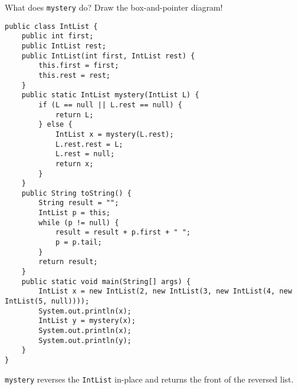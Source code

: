 \begin{blocksection}
\question What does \lstinline$mystery$ do? Draw the box-and-pointer diagram!

\begin{lstlisting}
public class IntList {
    public int first;
    public IntList rest;
    public IntList(int first, IntList rest) {
        this.first = first;
        this.rest = rest;
    }
    public static IntList mystery(IntList L) {
        if (L == null || L.rest == null) {
            return L;
        } else {
            IntList x = mystery(L.rest);
            L.rest.rest = L;
            L.rest = null;
            return x;
        }
    }
    public String toString() {
        String result = "";
        IntList p = this;
        while (p != null) {
            result = result + p.first + " ";
            p = p.tail;
        }
        return result;
    }
    public static void main(String[] args) {
        IntList x = new IntList(2, new IntList(3, new IntList(4, new IntList(5, null))));
        System.out.println(x);
        IntList y = mystery(x);
        System.out.println(x);
        System.out.println(y);
    }
}
\end{lstlisting}

\begin{solution}
\lstinline$mystery$ reverses the \lstinline$IntList$ in-place and returns the
front of the reversed list.
\end{solution}
\end{blocksection}
